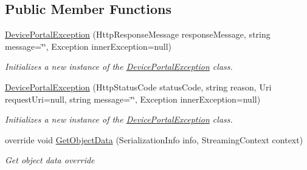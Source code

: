 \subsection*{Public Member Functions}
\begin{DoxyCompactItemize}
\item 
\hyperlink{class_microsoft_1_1_tools_1_1_windows_device_portal_1_1_device_portal_exception_a88d433d6ec6d1aca5a9ae46f50bda18e}{Device\+Portal\+Exception} (Http\+Response\+Message response\+Message, string message=\char`\"{}\char`\"{}, Exception inner\+Exception=null)
\begin{DoxyCompactList}\small\item\em Initializes a new instance of the \hyperlink{class_microsoft_1_1_tools_1_1_windows_device_portal_1_1_device_portal_exception}{Device\+Portal\+Exception} class. \end{DoxyCompactList}\item 
\hyperlink{class_microsoft_1_1_tools_1_1_windows_device_portal_1_1_device_portal_exception_affc3c9d749236320280cc1558bc63ca5}{Device\+Portal\+Exception} (Http\+Status\+Code status\+Code, string reason, Uri request\+Uri=null, string message=\char`\"{}\char`\"{}, Exception inner\+Exception=null)
\begin{DoxyCompactList}\small\item\em Initializes a new instance of the \hyperlink{class_microsoft_1_1_tools_1_1_windows_device_portal_1_1_device_portal_exception}{Device\+Portal\+Exception} class. \end{DoxyCompactList}\item 
override void \hyperlink{class_microsoft_1_1_tools_1_1_windows_device_portal_1_1_device_portal_exception_af50756f7162aac51e4990ffc38ffb9f1}{Get\+Object\+Data} (Serialization\+Info info, Streaming\+Context context)
\begin{DoxyCompactList}\small\item\em Get object data override \end{DoxyCompactList}\end{DoxyCompactItemize}

